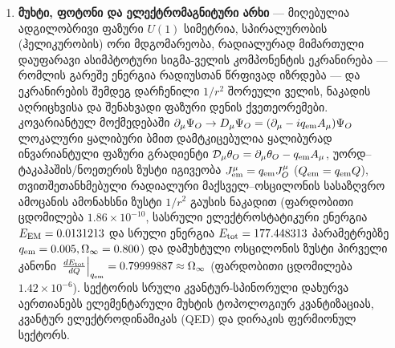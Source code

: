 \documentclass[11pt,a4paper]{article}
\begin{document}
\begin{enumerate}[label=\arabic*.]
ფერმიონულ სტატისტიკასთან ხიდი დადგენილია ორი იდენტური მდგომარეობის გაცვლისას ზუსტი $\pi$-იანი ფაზით, ფოკის სივრცის ანტისიმეტრიითა და დირაკის ჰამილტონიანის ნორმალური დალაგების თეორემით: კანონიკური ანტიკომუტაციური თანაფარდობები $\{d_r, d_s^\dagger\} = \delta_{rs}$ აუცილებელი და საკმარისია დადებითად განსაზღვრული ფოკის ჰამილტონიანისა ($:H_D:_{\rm Fermi} = \sum E_{\mathbf{p}}(n_b + n_d) \ge 0$) და პაულის აკრძალვის პრინციპის ($(b_s^\dagger)^2|0\rangle = 0$) მისაღებად, მაშინ როცა ბოზონური კომუტაცია იძლევა ქვემოდან შემოუსაზღვრელ ენერგიას. შემდგომ მიკროსკოპულ ამოცანად რჩება 4-კომპონენტიანი დირაკის სპინორული ველის $\Psi(x)$ უშუალო კოლექტიურ-კოორდინატული აგება 3D არაწრფივი ტოროიდალური სოლიტონის პროფილიდან (სკირმ–ფადეევ–ჰოპფის ტიპის ბირთვის ფინკელშტაინ–რუბინშტაინის კვანტიზაცია).
\item \textbf{მუხტი, ფოტონი და ელექტრომაგნიტური არხი} — მიღებულია ადგილობრივი ფაზური $U(1)$ სიმეტრია, სპირალურობის (ჰელიკურობის) ორი მდგომარეობა, რადიალურად მიმართული დაუფარავი ასიმპტოტური სიგმა-ველის კომპონენტის ეკრანირება — რომლის გარეშე ენერგია რადიუსთან წრფივად იზრდება — და ეკრანირების შემდეგ დარჩენილი $1/r^2$ შორეული ველის, ნაკადის აღრიცხვისა და შენახვადი ფაზური დენის ქვეთეორემები. კოვარიანტულ მოქმედებაში $\partial_\mu\Psi_O \to D_\mu\Psi_O = (\partial_\mu - i q_{\rm em}A_\mu)\Psi_O$ ლოკალური ყალიბური ბმით დამტკიცებულია ყალიბურად ინვარიანტული ფაზური გრადიენტი $\mathcal{D}_\mu\theta_O = \partial_\mu\theta_O - q_{\rm em}A_\mu$, უორდ–ტაკაჰაშის/ნოეთერის ზუსტი იგივეობა $J_{\rm em}^\mu = q_{\rm em}J_O^\mu$ ($Q_{\rm em} = q_{\rm em}Q$), თვითშეთანხმებული რადიალური მაქსველ–ოსცილონის სასაზღვრო ამოცანის ამონახსნი ზუსტი $1/r^2$ გაუსის ნაკადით (ფარდობითი ცდომილება $1.86\times 10^{-10}$, სასრული ელექტროსტატიკური ენერგია $E_{\rm EM} = 0.0131213$ და სრული ენერგია $E_{\rm tot} = 177.448313$ პარამეტრებზე $q_{\rm em}=0.005, \Omega_\infty=0.800$) და დამუხტული ოსცილონის ზუსტი პირველი კანონი $\left.\frac{dE_{\rm tot}}{dQ}\right|_{q_{\rm em}} = 0.79999887 \approx \Omega_\infty$ (ფარდობითი ცდომილება $1.42\times 10^{-6}$). სექტორის სრული კვანტურ-სპინორული დახურვა აერთიანებს ელემენტარული მუხტის ტოპოლოგიურ კვანტიზაციას, კვანტურ ელექტროდინამიკას (QED) და დირაკის ფერმიონულ სექტორს.

\end{enumerate}
\end{document}
